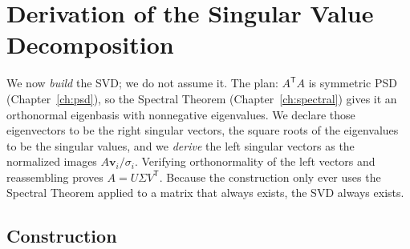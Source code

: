 \documentclass[11pt,oneside]{book}
\theoremstyle{plain}
\theoremstyle{definition}
\theoremstyle{remark}
\newcommand{\T}{^{\mathsf T}}
\newcommand{\bv}{\mathbf{v}}
\begin{document}
\chapter{Derivation of the Singular Value Decomposition}\label{ch:svd}

\begin{intuition_box}
We now \emph{build} the SVD; we do not assume it. The plan: $A\T A$ is symmetric PSD
(Chapter~\ref{ch:psd}), so the Spectral Theorem (Chapter~\ref{ch:spectral}) gives it an
orthonormal eigenbasis with nonnegative eigenvalues. We declare those eigenvectors to be
the right singular vectors, the square roots of the eigenvalues to be the singular
values, and we \emph{derive} the left singular vectors as the normalized images
$A\bv_i/\sigma_i$. Verifying orthonormality of the left vectors and reassembling proves
$A=U\Sigma V\T$. Because the construction only ever uses the Spectral Theorem applied to
a matrix that always exists, the SVD always exists.
\end{intuition_box}

\section{Construction}
\end{document}
